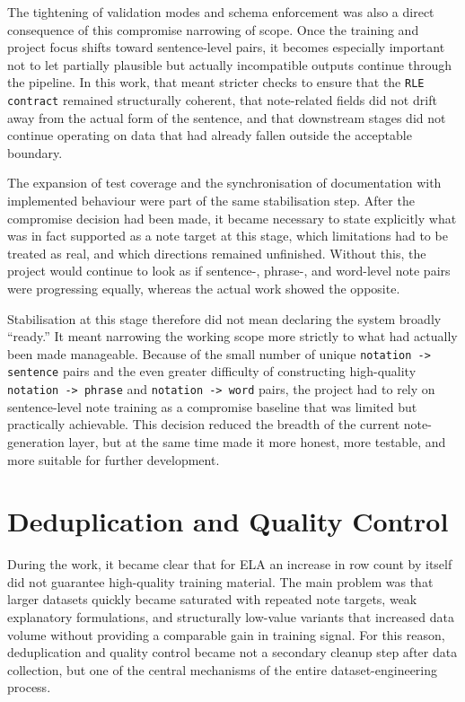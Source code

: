 \documentclass[12pt,a4paper,oneside]{report}
\begin{document}
The tightening of validation modes and schema enforcement was also a direct consequence of this compromise narrowing of scope. Once the training and project focus shifts toward sentence-level pairs, it becomes especially important not to let partially plausible but actually incompatible outputs continue through the pipeline. In this work, that meant stricter checks to ensure that the \texttt{RLE contract} remained structurally coherent, that note-related fields did not drift away from the actual form of the sentence, and that downstream stages did not continue operating on data that had already fallen outside the acceptable boundary.

The expansion of test coverage and the synchronisation of documentation with implemented behaviour were part of the same stabilisation step. After the compromise decision had been made, it became necessary to state explicitly what was in fact supported as a note target at this stage, which limitations had to be treated as real, and which directions remained unfinished. Without this, the project would continue to look as if sentence-, phrase-, and word-level note pairs were progressing equally, whereas the actual work showed the opposite.

Stabilisation at this stage therefore did not mean declaring the system broadly ``ready.'' It meant narrowing the working scope more strictly to what had actually been made manageable. Because of the small number of unique \texttt{notation -> sentence} pairs and the even greater difficulty of constructing high-quality \texttt{notation -> phrase} and \texttt{notation -> word} pairs, the project had to rely on sentence-level note training as a compromise baseline that was limited but practically achievable. This decision reduced the breadth of the current note-generation layer, but at the same time made it more honest, more testable, and more suitable for further development.

\section{Deduplication and Quality Control}
During the work, it became clear that for ELA an increase in row count by itself did not guarantee high-quality training material. The main problem was that larger datasets quickly became saturated with repeated note targets, weak explanatory formulations, and structurally low-value variants that increased data volume without providing a comparable gain in training signal. For this reason, deduplication and quality control became not a secondary cleanup step after data collection, but one of the central mechanisms of the entire dataset-engineering process.
\end{document}
